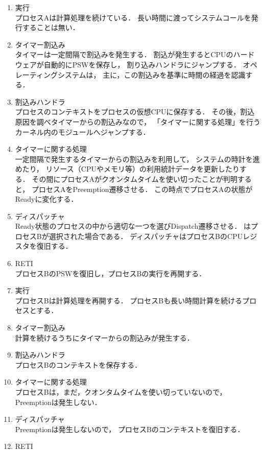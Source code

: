 \begin{enumerate}
\item 実行 \\
  プロセスAは計算処理を続けている．
  長い時間に渡ってシステムコールを発行することは無い．
\item タイマー割込み \\
  タイマーは一定間隔で割込みを発生する．
  割込が発生するとCPUのハードウェアが自動的にPSWを保存し，
  割り込みハンドラにジャンプする．
  オペレーティングシステムは，
  主に，この割込みを基準に時間の経過を認識する．
\item 割込みハンドラ \\
  プロセスのコンテキストをプロセスの仮想CPUに保存する．
  その後，割込原因を調べタイマーからの割込みなので，
  「タイマーに関する処理」を行うカーネル内のモジュールへジャンプする．
\item タイマーに関する処理 \\
  一定間隔で発生するタイマーからの割込みを利用して，
  システムの時計を進めたり，
  リソース（CPUやメモリ等）の利用統計データを更新したりする．
  その間にプロセスAがクオンタムタイムを使い切ったことが判明すると，
  プロセスAをPreemption遷移させる．
  この時点でプロセスAの状態がReadyに変化する．
\item ディスパッチャ \\
  Ready状態のプロセスの中から適切な一つを選びDispatch遷移させる．
  はプロセスBが選択された場合である．
  ディスパッチャはプロセスBのCPUレジスタを復旧する．
\item RETI \\
  プロセスBのPSWを復旧し，プロセスBの実行を再開する．
\item 実行 \\
  プロセスBは計算処理を再開する．
  プロセスBも長い時間計算を続けるプロセスとする．
\item タイマー割込み \\
  計算を続けるうちにタイマーからの割込みが発生する．
\item 割込みハンドラ \\
  プロセスBのコンテキストを保存する．
\item タイマーに関する処理 \\
  プロセスBは，まだ，クオンタムタイムを使い切っていないので，
  Preemptionは発生しない．
\item ディスパッチャ \\
  Preemptionは発生しないので，
  プロセスBのコンテキストを復旧する．
\item RETI \\

\end{enumerate}
